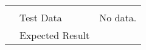 \begin{longtable}[]{p{1.3cm}p{2cm}p{13cm}}
\begin{minipage}[t]{13cm}
{            \vspace{\dp0}
            } \end{minipage} \\ \cline{2-3}
            & Test Data &
            \begin{minipage}[t]{13cm}{\footnotesize
                No data.
                \vspace{\dp0}
            } \end{minipage} \\ \cline{2-3}
            & Expected Result &
        \\ \midrule
    \end{longtable}

